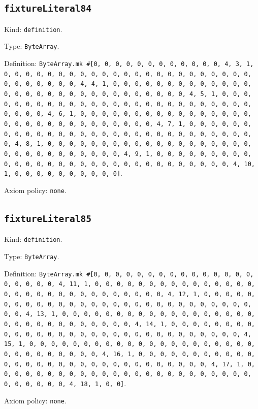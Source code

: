 \documentclass[11pt]{article}
\begin{document}
\subsection*{\texttt{fixtureLiteral84}}
\noindent Kind: \texttt{definition}.\par
\noindent Type: \texttt{ByteArray}.\par
\noindent Definition: \texttt{ByteArray.mk \#[0, 0, 0, 0, 0, 0, 0, 0, 0, 0, 0, 0, 4, 3, 1, 0, 0, 0, 0, 0, 0, 0, 0, 0, 0, 0, 0, 0, 0, 0, 0, 0, 0, 0, 0, 0, 0, 0, 0, 0, 0, 0, 0, 0, 0, 4, 4, 1, 0, 0, 0, 0, 0, 0, 0, 0, 0, 0, 0, 0, 0, 0, 0, 0, 0, 0, 0, 0, 0, 0, 0, 0, 0, 0, 0, 0, 0, 0, 4, 5, 1, 0, 0, 0, 0, 0, 0, 0, 0, 0, 0, 0, 0, 0, 0, 0, 0, 0, 0, 0, 0, 0, 0, 0, 0, 0, 0, 0, 0, 0, 0, 4, 6, 1, 0, 0, 0, 0, 0, 0, 0, 0, 0, 0, 0, 0, 0, 0, 0, 0, 0, 0, 0, 0, 0, 0, 0, 0, 0, 0, 0, 0, 0, 0, 4, 7, 1, 0, 0, 0, 0, 0, 0, 0, 0, 0, 0, 0, 0, 0, 0, 0, 0, 0, 0, 0, 0, 0, 0, 0, 0, 0, 0, 0, 0, 0, 0, 4, 8, 1, 0, 0, 0, 0, 0, 0, 0, 0, 0, 0, 0, 0, 0, 0, 0, 0, 0, 0, 0, 0, 0, 0, 0, 0, 0, 0, 0, 0, 0, 0, 4, 9, 1, 0, 0, 0, 0, 0, 0, 0, 0, 0, 0, 0, 0, 0, 0, 0, 0, 0, 0, 0, 0, 0, 0, 0, 0, 0, 0, 0, 0, 0, 0, 4, 10, 1, 0, 0, 0, 0, 0, 0, 0, 0, 0, 0]}.\par
\noindent Axiom policy: \texttt{none}.\par
\subsection*{\texttt{fixtureLiteral85}}
\noindent Kind: \texttt{definition}.\par
\noindent Type: \texttt{ByteArray}.\par
\noindent Definition: \texttt{ByteArray.mk \#[0, 0, 0, 0, 0, 0, 0, 0, 0, 0, 0, 0, 0, 0, 0, 0, 0, 0, 0, 0, 4, 11, 1, 0, 0, 0, 0, 0, 0, 0, 0, 0, 0, 0, 0, 0, 0, 0, 0, 0, 0, 0, 0, 0, 0, 0, 0, 0, 0, 0, 0, 0, 0, 4, 12, 1, 0, 0, 0, 0, 0, 0, 0, 0, 0, 0, 0, 0, 0, 0, 0, 0, 0, 0, 0, 0, 0, 0, 0, 0, 0, 0, 0, 0, 0, 0, 4, 13, 1, 0, 0, 0, 0, 0, 0, 0, 0, 0, 0, 0, 0, 0, 0, 0, 0, 0, 0, 0, 0, 0, 0, 0, 0, 0, 0, 0, 0, 0, 0, 4, 14, 1, 0, 0, 0, 0, 0, 0, 0, 0, 0, 0, 0, 0, 0, 0, 0, 0, 0, 0, 0, 0, 0, 0, 0, 0, 0, 0, 0, 0, 0, 0, 4, 15, 1, 0, 0, 0, 0, 0, 0, 0, 0, 0, 0, 0, 0, 0, 0, 0, 0, 0, 0, 0, 0, 0, 0, 0, 0, 0, 0, 0, 0, 0, 0, 4, 16, 1, 0, 0, 0, 0, 0, 0, 0, 0, 0, 0, 0, 0, 0, 0, 0, 0, 0, 0, 0, 0, 0, 0, 0, 0, 0, 0, 0, 0, 0, 0, 4, 17, 1, 0, 0, 0, 0, 0, 0, 0, 0, 0, 0, 0, 0, 0, 0, 0, 0, 0, 0, 0, 0, 0, 0, 0, 0, 0, 0, 0, 0, 0, 0, 4, 18, 1, 0, 0]}.\par
\noindent Axiom policy: \texttt{none}.\par
\end{document}
